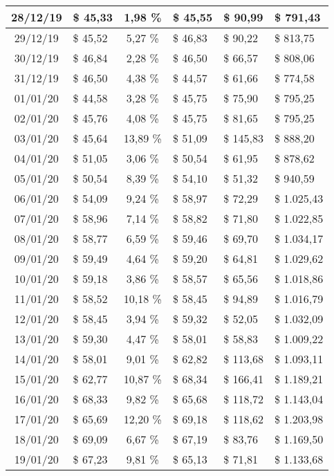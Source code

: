 \begin{center}
\begin{small}
\begin{longtable}{|c|l|c|l|l|l|}
28/12/19 & \$ 45,33 & 1,98 \% & \$ 45,55 & \$ 90,99 & \$ 791,43 \\ \hline
29/12/19 & \$ 45,52 & 5,27 \% & \$ 46,83 & \$ 90,22 & \$ 813,75 \\ \hline
30/12/19 & \$ 46,84 & 2,28 \% & \$ 46,50 & \$ 66,57 & \$ 808,06 \\ \hline
31/12/19 & \$ 46,50 & 4,38 \% & \$ 44,57 & \$ 61,66 & \$ 774,58 \\ \hline
01/01/20 & \$ 44,58 & 3,28 \% & \$ 45,75 & \$ 75,90 & \$ 795,25 \\ \hline
02/01/20 & \$ 45,76 & 4,08 \% & \$ 45,75 & \$ 81,65 & \$ 795,25 \\ \hline
03/01/20 & \$ 45,64 & 13,89 \% & \$ 51,09 & \$ 145,83 & \$ 888,20 \\ \hline
04/01/20 & \$ 51,05 & 3,06 \% & \$ 50,54 & \$ 61,95 & \$ 878,62 \\ \hline
05/01/20 & \$ 50,54 & 8,39 \% & \$ 54,10 & \$ 51,32 & \$ 940,59 \\ \hline
06/01/20 & \$ 54,09 & 9,24 \% & \$ 58,97 & \$ 72,29 & \$ 1.025,43 \\ \hline
07/01/20 & \$ 58,96 & 7,14 \% & \$ 58,82 & \$ 71,80 & \$ 1.022,85 \\ \hline
08/01/20 & \$ 58,77 & 6,59 \% & \$ 59,46 & \$ 69,70 & \$ 1.034,17 \\ \hline
09/01/20 & \$ 59,49 & 4,64 \% & \$ 59,20 & \$ 64,81 & \$ 1.029,62 \\ \hline
10/01/20 & \$ 59,18 & 3,86 \% & \$ 58,57 & \$ 65,56 & \$ 1.018,86 \\ \hline
11/01/20 & \$ 58,52 & 10,18 \% & \$ 58,45 & \$ 94,89 & \$ 1.016,79 \\ \hline
12/01/20 & \$ 58,45 & 3,94 \% & \$ 59,32 & \$ 52,05 & \$ 1.032,09 \\ \hline
13/01/20 & \$ 59,30 & 4,47 \% & \$ 58,01 & \$ 58,83 & \$ 1.009,22 \\ \hline
14/01/20 & \$ 58,01 & 9,01 \% & \$ 62,82 & \$ 113,68 & \$ 1.093,11 \\ \hline
15/01/20 & \$ 62,77 & 10,87 \% & \$ 68,34 & \$ 166,41 & \$ 1.189,21 \\ \hline
16/01/20 & \$ 68,33 & 9,82 \% & \$ 65,68 & \$ 118,72 & \$ 1.143,04 \\ \hline
17/01/20 & \$ 65,69 & 12,20 \% & \$ 69,18 & \$ 118,62 & \$ 1.203,98 \\ \hline
18/01/20 & \$ 69,09 & 6,67 \% & \$ 67,19 & \$ 83,76 & \$ 1.169,50 \\ \hline
19/01/20 & \$ 67,23 & 9,81 \% & \$ 65,13 & \$ 71,81 & \$ 1.133,68 \\ \hline

\end{longtable}
\end{small}
\end{center}
